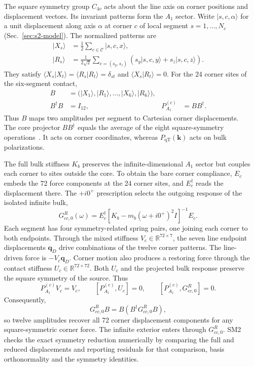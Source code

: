 \documentclass[10pt,aps,onecolumn,floatfix,notitlepage,nofootinbib,showkeys]{revtex4-2}
\newcommand{\vk}{\bm{k}}
\newcommand{\vq}{\bm{q}}
\newcommand{\Cc}{\mathcal C}
\newcommand{\PqT}{P_{\mathrm{qT}}}
\newcommand{\PAone}{P_{A_1}^{(c)}}
\begin{document}
The square symmetry group $C_{4v}$ acts about the line axis on corner positions and displacement vectors. Its invariant patterns form the $A_1$ sector. Write $|s,c,\alpha\rangle$ for a unit displacement along axis $\alpha$ at corner $c$ of local segment $s=1,\ldots,N_c$ (Sec.~\ref{sec:s2-model}). The normalized patterns are
\begin{align}
  |X_s\rangle
  &=\frac12\sum_{c\in\Cc}|s,c,x\rangle,\\
  |R_s\rangle
  &=\frac{1}{2\sqrt2}
   \sum_{c=(s_y,s_z)}
   \left(s_y|s,c,y\rangle+s_z|s,c,z\rangle\right).
  \label{eq:s4-XR-basis}
\end{align}
They satisfy
$\langle X_s|X_t\rangle=\langle R_s|R_t\rangle=\delta_{st}$ and
$\langle X_s|R_t\rangle=0$.  For the 24 corner sites of the six-segment contact,
\begin{align}
  B&=\bigl(|X_1\rangle,|R_1\rangle,\ldots,
  |X_6\rangle,|R_6\rangle\bigr),\\
  B^\dagger B&=I_{12},
  &\PAone&=BB^\dagger.
  \label{eq:s4-core-basis}
\end{align}
Thus $B$ maps two amplitudes per segment to Cartesian corner displacements. The core projector $BB^\dagger$ equals the average of the eight square-symmetry operations~\cite{Dresselhaus2008}. It acts on corner coordinates, whereas $\PqT(\vk)$ acts on bulk polarizations.

The full bulk stiffness $K_b$ preserves the infinite-dimensional $A_1$ sector but couples each corner to sites outside the core. To obtain the bare corner compliance, $E_c$ embeds the 72 force components at the 24 corner sites, and $E_c^\dagger$ reads the displacement there. The $+i0^+$ prescription selects the outgoing response of the isolated infinite bulk,
\begin{equation}
  G_{cc,0}^R(\omega)
  =E_c^\dagger
   \left[K_b-m_b(\omega+i0^+)^2 I\right]^{-1}
   E_c.
  \label{eq:s4-core-resolvent}
\end{equation}
Each segment has four symmetry-related spring pairs, one joining each corner to both endpoints. Through the mixed stiffness $V_c\in\mathbb R^{72\times7}$, the seven line endpoint displacements $\vq_D$ drive combinations of the twelve corner patterns. The line-driven force is $-V_c\vq_D$. Corner motion also produces a restoring force through the contact stiffness $U_c\in\mathbb R^{72\times72}$. Both $U_c$ and the projected bulk response preserve the square symmetry of the source. Thus
\begin{equation}
  \PAone V_c=V_c,
  \qquad
  [\PAone,U_c]=0,
  \qquad
  [\PAone,G_{cc,0}^R]=0.
  \label{eq:s4-exact-reduction-identities}
\end{equation}
Consequently,
\begin{equation}
  G_{cc,0}^R B
  =B\left(B^\dagger G_{cc,0}^R B\right),
  \label{eq:s4-reduced-resolvent}
\end{equation}
so twelve amplitudes recover all 72 corner displacement components for any square-symmetric corner force. The infinite exterior enters through $G_{cc,0}^R$. SM2 checks the exact symmetry reduction numerically by comparing the full and reduced displacements and reporting residuals for that comparison, basis orthonormality and the symmetry identities.
\end{document}
